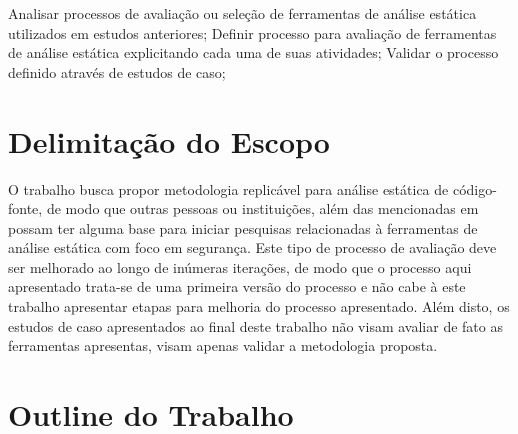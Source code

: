 Analisar processos de avaliação ou seleção de ferramentas de análise estática utilizados em estudos anteriores;
Definir processo para avaliação de ferramentas de análise estática explicitando cada uma de suas atividades;
Validar o processo definido através de estudos de caso;

\section{Delimitação do Escopo}

O trabalho busca propor metodologia replicável para análise estática de código-fonte, de modo que outras pessoas ou instituições, além das mencionadas em  possam ter alguma base para iniciar pesquisas relacionadas à ferramentas de análise estática com foco em segurança. Este tipo de processo de avaliação deve ser melhorado ao longo de inúmeras iterações, de modo que o processo aqui apresentado trata-se de uma primeira versão do processo e não cabe à este trabalho apresentar etapas para melhoria do processo apresentado. Além disto, os estudos de caso apresentados ao final deste trabalho não visam avaliar de fato as ferramentas apresentas, visam apenas validar a metodologia proposta.

\section{Outline do Trabalho}

